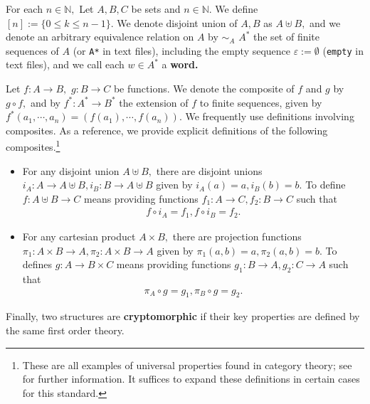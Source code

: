 For each $n \in \mathbb{N},$ Let $A, B, C$ be sets and $n \in \mathbb{N}$. We define $[n] := \{0 \leq k \leq n-1\}.$ We denote disjoint union of $A, B$ as $A \uplus B,$ and we denote an arbitrary equivalence relation on $A$ by $\sim_{A}$
$A^{*}$ the set of finite sequences of $A$ (or \texttt{A*} in text files), including the empty sequence $\varepsilon := \emptyset$ (\texttt{empty} in text files), and we call each $w \in A^{*}$ a \textbf{word.}

Let $f: A \to B,$ $g: B \to C$ be functions. We denote the composite of $f$ and $g$ by $g \circ f,$ and by $f^{*}: A^{*} \to B^{*}$ the extension of $f$ to finite sequences, given by $f^{*}(a_{1}, \cdots, a_{n}) = (f(a_{1}), \cdots, f(a_{n})).$ We frequently use definitions involving composites. As a reference, we provide explicit definitions of the following composites.\footnote{These are all examples of universal properties found in category theory; see \cite{maclane} for further information. It suffices to expand these definitions in certain cases for this standard.}

\begin{itemize}
  \item For any disjoint union $A \uplus B,$ there are disjoint unions $i_{A}: A \to A \uplus B, i_{B}: B \to A \uplus B$ given by $i_{A}(a) = a, i_{B}(b) = b.$ To define $f: A \uplus B \to C$ means providing functions $f_{1}: A \to C, f_{2}: B \to C$ such that
  \begin{align*}
    f \circ i_{A} = f_{1}, f \circ i_{B} = f_{2}.
  \end{align*}
  \item For any cartesian product $A \times B,$ there are projection functions $\pi_{1}: A \times B \to A, \pi_{2}: A \times B \to A$ given by $\pi_{1}(a, b) = a, \pi_{2}(a, b) = b.$ To defines $g: A \to B \times C$ means providing functions $g_{1}: B \to A, g_{2}: C \to A$ such that
  \begin{align*}
    \pi_{A} \circ g = g_{1}, \pi_{B} \circ g = g_{2}.
  \end{align*}
\end{itemize}

Finally, two structures are \textbf{cryptomorphic} if their key properties are defined by the same first order theory. %

